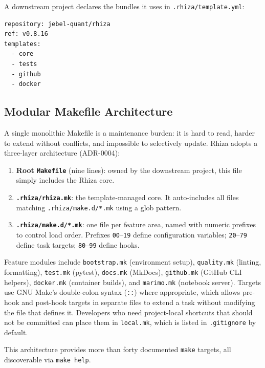 \documentclass[12pt,a4paper]{article}
\begin{document}
A downstream project declares the bundles it uses in \texttt{.rhiza/template.yml}:

\begin{lstlisting}[style=yaml, caption={Example \texttt{.rhiza/template.yml}.}]
repository: jebel-quant/rhiza
ref: v0.8.16
templates:
  - core
  - tests
  - github
  - docker
\end{lstlisting}

\subsection{Modular Makefile Architecture}
\label{sec:makefile}

A single monolithic Makefile is a maintenance burden: it is hard to read, harder to extend without conflicts, and impossible to selectively update. Rhiza adopts a three-layer architecture (ADR-0004):

\begin{enumerate}[leftmargin=*]
  \item \textbf{Root \texttt{Makefile}} (nine lines): owned by the downstream project, this file simply includes the Rhiza core.
  \item \textbf{\texttt{.rhiza/rhiza.mk}}: the template-managed core. It auto-includes all files matching \texttt{.rhiza/make.d/*.mk} using a glob pattern.
  \item \textbf{\texttt{.rhiza/make.d/*.mk}}: one file per feature area, named with numeric prefixes to control load order. Prefixes \texttt{00}--\texttt{19} define configuration variables; \texttt{20}--\texttt{79} define task targets; \texttt{80}--\texttt{99} define hooks.
\end{enumerate}

Feature modules include \texttt{bootstrap.mk} (environment setup), \texttt{quality.mk} (linting, formatting), \texttt{test.mk} (pytest), \texttt{docs.mk} (MkDocs), \texttt{github.mk} (GitHub CLI helpers), \texttt{docker.mk} (container builds), and \texttt{marimo.mk} (notebook server). Targets use GNU Make's double-colon syntax (\texttt{::}) where appropriate, which allows pre-hook and post-hook targets in separate files to extend a task without modifying the file that defines it. Developers who need project-local shortcuts that should not be committed can place them in \texttt{local.mk}, which is listed in \texttt{.gitignore} by default.

This architecture provides more than forty documented \texttt{make} targets, all discoverable via \texttt{make help}.
\end{document}
